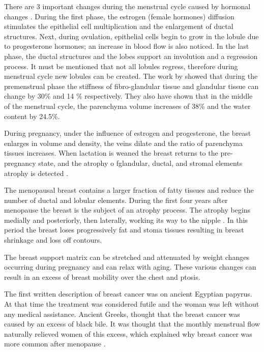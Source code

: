There are 3 important changes during the menstrual cycle caused by hormonal changes \citep{andolina2011mammographic}. During the first phase, the estrogen (female hormones) diffusion stimulates the epithelial cell multiplication and the enlargement of ductal structures. Next, during ovulation, epithelial cells begin to grow in the lobule due to progesterone hormones; an increase in blood flow is also noticed. In the last phase, the ductal structures and the lobes support an involution and a regression process. It must be mentioned that not all lobules regress, therefore during menstrual cycle new lobules can be created.   The work by \cite{lorenzen_menstrual-cycle_2003} showed that during the premenstrual phase the stiffness of fibro-glandular tissue and glandular tissue can change by 30\% and 14 \% respectively. They also have shown that in the middle of the menstrual cycle, the parenchyma volume increases of 38\% and the water content by 24.5\%.

During pregnancy, under the influence of estrogen and progesterone, the breast enlarges in volume and density, the veins dilate and the ratio of parenchyma tissues increases.  When lactation is weaned the breast returns to the pre-pregnancy state, and the atrophy o fglandular, ductal, and stromal elements atrophy is detected \citep{pandya_breast_2011}.

The menopausal breast contains a larger fraction of fatty tissues and reduce the number of ductal and lobular elements. During the first four years after menopause the breast is the subject of an atrophy process. The atrophy begins medially and posteriorly, then laterally, working its way to the nipple \citep{andolina2011mammographic}. In this period the breast loses progressively fat and stoma tissues resulting in breast shrinkage and loss off contours.

 The breast support matrix can be stretched and attenuated by weight changes occurring during pregnancy and can relax with aging. These various changes can result in an excess of breast mobility over the chest and ptosis. 

\label{section:breastcancer}

The first written description of breast cancer was on ancient Egyptian papyrus. At that time the treatment was considered futile and the woman was left without any medical assistance. Ancient Greeks, thought that the breast cancer was caused by an excess of black bile. It was thought that the monthly menstrual flow naturally relieved women of this excess, which explained why breast cancer was more common after menopause \citep{andolina2011mammographic}.

